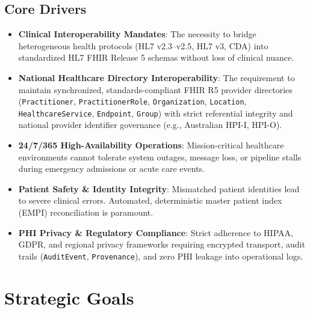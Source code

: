 \subsection{Core Drivers}
\begin{itemize}
    \item \textbf{Clinical Interoperability Mandates}: The necessity to bridge heterogeneous health protocols (HL7 v2.3--v2.5, HL7 v3, CDA) into standardized HL7 FHIR Release 5 schemas without loss of clinical nuance.
    \item \textbf{National Healthcare Directory Interoperability}: The requirement to maintain synchronized, standards-compliant FHIR R5 provider directories (\texttt{Practitioner}, \texttt{PractitionerRole}, \texttt{Organization}, \texttt{Location}, \texttt{HealthcareService}, \texttt{Endpoint}, \texttt{Group}) with strict referential integrity and national provider identifier governance (e.g., Australian HPI-I, HPI-O).
    \item \textbf{24/7/365 High-Availability Operations}: Mission-critical healthcare environments cannot tolerate system outages, message loss, or pipeline stalls during emergency admissions or acute care events.
    \item \textbf{Patient Safety \& Identity Integrity}: Mismatched patient identities lead to severe clinical errors. Automated, deterministic master patient index (EMPI) reconciliation is paramount.
    \item \textbf{PHI Privacy \& Regulatory Compliance}: Strict adherence to HIPAA, GDPR, and regional privacy frameworks requiring encrypted transport, audit trails (\texttt{AuditEvent}, \texttt{Provenance}), and zero PHI leakage into operational logs.
\end{itemize}

\section{Strategic Goals}

